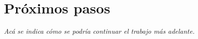 \section{Próximos pasos}

\emph{Acá se indica cómo se podría continuar el trabajo más adelante.}

%
%
%
%
%
%
%
%
%
%
%
%
%
%
%
%



